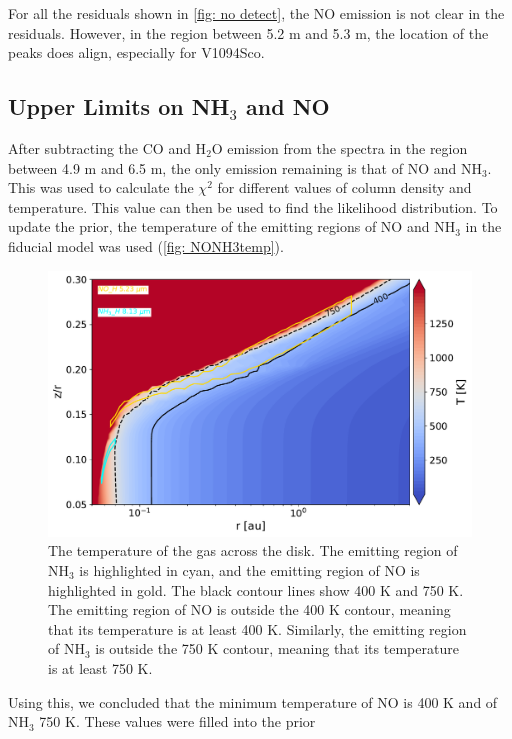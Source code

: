 \documentclass[oneside, single, authoryear, semicolon, 12pt]{lion-msc}
\newcommand{\4}{$_4$}
\newcommand{\3}{$_3$}
\newcommand{\2}{$_2$}
\begin{document}
For all the residuals shown in \autoref{fig: no detect}, the NO emission is not clear in the residuals. However, in the region between 5.2 \textmu m and 5.3 \textmu m, the location of the peaks does align, especially for V1094Sco.

\subsection{Upper Limits on NH\3 and NO}
After subtracting the CO and H\2O emission from the spectra in the region between 4.9 \textmu m and 6.5 \textmu m, the only emission remaining is that of NO and NH\3. This was used to calculate the $\chi^2$ for different values of column density and temperature. This value can then be used to find the likelihood distribution. To update the prior, the temperature of the emitting regions of NO and NH\3 in the fiducial model was used (\autoref{fig: NONH3temp}).

\begin{figure}[H]
    \centering
    \includegraphics[width=\linewidth]{Figures/NONH3temp.pdf}
    \caption{The temperature of the gas across the disk. The emitting region of NH\3 is highlighted in cyan, and the emitting region of NO is highlighted in gold. The black contour lines show 400 K and 750 K. The emitting region of NO is outside the 400 K contour, meaning that its temperature is at least 400 K. Similarly, the emitting region of NH\3 is outside the 750 K contour, meaning that its temperature is at least 750 K.}
    \label{fig: NONH3temp}
\end{figure}

Using this, we concluded that the minimum temperature of NO is 400 K and of NH\3 750 K. These values were filled into the prior
\end{document}
